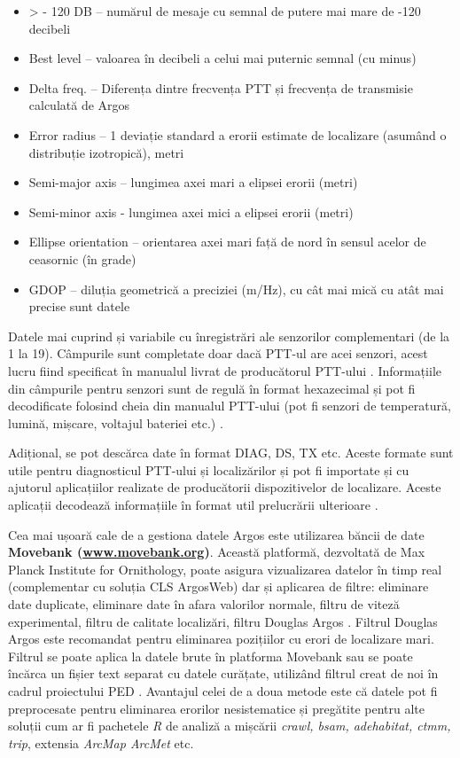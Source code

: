 \documentclass[11pt,onehalfspacing]{elife}
\begin{document}
\begin{itemize}
    \item > - 120 DB – numărul de mesaje cu semnal de putere mai mare de -120 decibeli
    \item Best level – valoarea în decibeli a celui mai puternic semnal (cu minus)
    \item Delta freq. – Diferența dintre frecvența PTT și frecvența de transmisie calculată de Argos
    \item Error radius – 1 deviație standard a erorii estimate de localizare (asumând o distribuție izotropică), metri
    \item Semi-major axis – lungimea axei mari a elipsei erorii (metri)
    \item Semi-minor axis - lungimea axei mici a elipsei erorii (metri)
    \item Ellipse orientation – orientarea axei mari față de nord în sensul acelor de ceasornic (în grade)
    \item GDOP – diluția geometrică a preciziei (m/Hz), cu cât mai mică cu atât mai precise sunt datele
\end{itemize}

Datele mai cuprind și variabile cu înregistrări ale senzorilor complementari (de la 1 la 19). Câmpurile sunt completate doar dacă PTT-ul are acei senzori, acest lucru fiind specificat în manualul livrat de producătorul PTT-ului \citep{CLS2016}. Informațiile din câmpurile pentru senzori sunt de regulă în format hexazecimal și pot fi decodificate folosind cheia din manualul PTT-ului (pot fi senzori de temperatură, lumină, mișcare, voltajul bateriei etc.) \citep{CLS2016}.

Adițional, se pot descărca date în format DIAG, DS, TX etc. Aceste formate sunt utile pentru diagnosticul PTT-ului și localizărilor și pot fi importate și cu ajutorul aplicațiilor realizate de producătorii dispozitivelor de localizare. Aceste aplicații decodează informațiile în format util prelucrării ulterioare \citep{CLS2016}.

Cea mai ușoară cale de a gestiona datele Argos este utilizarea băncii de date \textbf{Movebank (\url{www.movebank.org})}. Această platformă, dezvoltată de Max Planck Institute for Ornithology, poate asigura vizualizarea datelor în timp real (complementar cu soluția CLS ArgosWeb) dar și aplicarea de filtre: eliminare date duplicate, eliminare date în afara valorilor normale, filtru de viteză experimental, filtru de calitate localizări, filtru Douglas Argos \citep{Kranstauber2011}. Filtrul Douglas Argos este recomandat pentru eliminarea pozițiilor cu erori de localizare mari. Filtrul se poate aplica la datele brute în platforma Movebank \citep{Douglas2012} sau se poate încărca un fișier text separat cu datele curățate, utilizând filtrul creat de noi în cadrul proiectului PED \citep{laurentiu_rozylowicz_2018_1321250}. Avantajul celei de a doua metode este că datele pot fi preprocesate pentru eliminarea erorilor nesistematice și pregătite pentru alte soluții cum ar fi pachetele \textit{R} de analiză a mișcării \textit{crawl, bsam, adehabitat, ctmm, trip}, extensia \textit{ArcMap ArcMet} etc.
\end{document}
